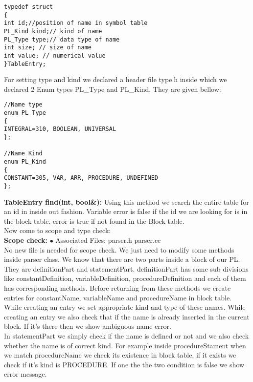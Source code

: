 \documentclass[paper=letter, fontsize=12pt]{scrartcl} %
\begin{document}
\begin{lstlisting}
typedef struct
{
int id;//position of name in symbol table
PL_Kind kind;// kind of name
PL_Type type;// data type of name
int size; // size of name
int value; // numerical value
}TableEntry;
\end{lstlisting}

For setting type and kind we declared a header file type.h inside which we declared 2 Enum types PL\_Type and PL\_Kind. They are given bellow: \\
\begin{lstlisting}
//Name type
enum PL_Type
{
INTEGRAL=310, BOOLEAN, UNIVERSAL
};

//Name Kind
enum PL_Kind
{
CONSTANT=305, VAR, ARR, PROCEDURE, UNDEFINED
};
\end{lstlisting}


{\bf TableEntry find(int, bool\&):} Using this method we search the entire table for an id in inside out fashion. Variable error is false if the id we are looking for is in
the block table. error is true if not found in the Block table.\\

Now come to scope and type check:\\

{\bf Scope check:}
$\bullet$ Associated Files: parser.h parser.cc\\
No new file is needed for scope check. We just need to modify some methods inside parser class. We know that there are two parts inside a block of our PL. They are definitionPart and statementPart. definitionPart has some sub divisions like constantDefinition, variableDefinition, procedureDefinition and each of them has corresponding methods. Before returning from these methods we create entries for constantName, variableName and procedureName in  block table. While creating an entry we set appropriate kind and type of these names. While creating an entry we also check that if the name is already inserted in the current block. If it's there then we show ambiguous name error.\\
In statementPart we simply check if the name is defined or not and we also check whether the name is of correct kind. For example inside procedureStament when we match procedureName we check its existence in block table, if it exists we check if it's kind is PROCEDURE. If one the the two condition is false we show error message. \\
\end{document}
